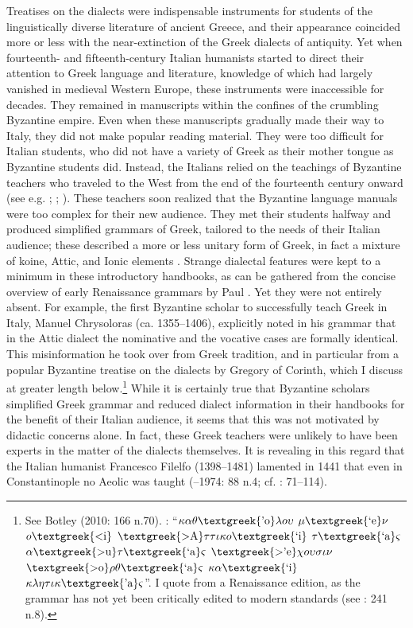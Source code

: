 \documentclass[output=paper]{langsci/langscibook}
\begin{document}
Treatises on the dialects were indispensable instruments for students of the linguistically diverse literature of ancient Greece, and their appearance coincided more or less with the near-extinction of the Greek dialects of antiquity. Yet when fourteenth- and fifteenth-century Italian humanists started to direct their attention to Greek language and literature, knowledge of which had largely vanished in medieval Western Europe, these instruments were inaccessible for decades. They remained in manuscripts within the confines of the crumbling Byzantine empire. Even when these manuscripts gradually made their way to Italy, they did not make popular reading material. They were too difficult for Italian students, who did not have a variety of Greek as their mother tongue as Byzantine students did. Instead, the Italians relied on the teachings of Byzantine teachers who traveled to the West from the end of the fourteenth century onward (see e.g. \citealt{Harris1995}; \citealt{Botley2010}; \citealt{Wilson2016}). These teachers soon realized that the Byzantine language manuals were too complex for their new audience. They met their students halfway and produced simplified grammars of Greek, tailored to the needs of their Italian audience; these described a more or less unitary form of Greek, in fact a mixture of koine, Attic, and Ionic elements \citep[123]{Ciccolella2008}. Strange dialectal features were kept to a minimum in these introductory handbooks, as can be gathered from the concise overview of early Renaissance grammars by Paul \citet{Botley2010}. Yet they were not entirely absent. For example, the first Byzantine scholar to successfully teach Greek in Italy, Manuel Chrysoloras (ca. 1355–1406), explicitly noted in his grammar that in the Attic dialect the nominative and the vocative cases are formally identical. This misinformation he took over from Greek tradition, and in particular from a popular Byzantine treatise on the dialects by Gregory of Corinth, which I discuss at greater length below.\footnote{See Botley (2010: 166 n.70). \citet[20]{Chrysoloras1512}: “$\kappa \alpha \theta \text{\textgreek{'o}}\lambda o\upsilon $ $\mu \text{\textgreek{`e}}\nu $ $o\text{\textgreek{<i}}$ $\text{\textgreek{>A}}\tau \tau \iota \kappa o\text{\textgreek{`i}}$ $\tau \text{\textgreek{`a}}\varsigma $ $\alpha \text{\textgreek{>u}}\tau \text{\textgreek{`a}}\varsigma $ $\text{\textgreek{>'e}}\chi o\upsilon \sigma \iota \nu $ $\text{\textgreek{>o}}\rho \theta \text{\textgreek{`a}}\varsigma $ $\kappa \alpha \text{\textgreek{`i}}$ $\kappa \lambda \eta \tau \iota \kappa \text{\textgreek{'a}}\varsigma $”. I quote from a Renaissance edition, as the grammar has not yet been critically edited to modern standards (see \citealt{Nuti2013}: 241 n.8).} While it is certainly true that Byzantine scholars simplified Greek grammar and reduced dialect information in their handbooks for the benefit of their Italian audience, it seems that this was not motivated by didactic concerns alone. In fact, these Greek teachers were unlikely to have been experts in the matter of the dialects themselves. It is revealing in this regard that the Italian humanist Francesco Filelfo (1398–1481) lamented in 1441 that even in Constantinople no Aeolic was taught (\citealt{Rotolo1973}–1974: 88 n.4; cf. \citealt{Botley2010}: 71–114).
\end{document}
